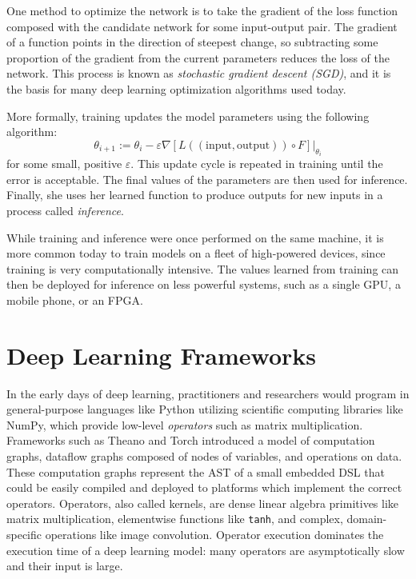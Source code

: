 One method to optimize the network is to take the gradient of the loss function composed with the
candidate network for some input-output pair. The gradient of a function points in the direction of
steepest change, so subtracting some proportion of the gradient from the current parameters reduces
the loss of the network. This process is known as \textit{stochastic gradient descent (SGD)}, and it
is the basis for many deep learning optimization algorithms used today.

More formally, training updates the model parameters using the following algorithm:
\[
  \theta_{i+1} := \theta_i - \varepsilon\nabla[L((\text{input}, \text{output})) \circ F]\Big|_{\theta_i}
\]
for some small, positive $\varepsilon$. This update cycle is repeated in training until
the error is acceptable. The final values of the parameters are then used for inference.
Finally, she uses her learned function to produce outputs for new inputs in
  a process called \textit{inference}.

While training and inference were once performed on the same machine,
  it is more common today to train models on a fleet of high-powered devices,
  since training is very computationally intensive.
The values learned from training can then be deployed for inference on less powerful systems,
  such as a single GPU, a mobile phone, or an FPGA.

\section{Deep Learning Frameworks}
\label{sec:dl_frameworks}

In the early days of deep learning, practitioners and researchers would program
  in general-purpose languages like Python utilizing
  scientific computing libraries like NumPy,
  which provide low-level \textit{operators} such as matrix multiplication.
Frameworks such as Theano and Torch introduced a model of
  computation graphs, dataflow graphs composed of nodes of
    variables, and operations on data.
These computation graphs represent the AST of a small
  embedded DSL that could be easily compiled and deployed
  to platforms which implement the correct operators.
Operators, also called kernels,
  are dense linear algebra primitives like matrix multiplication,
  elementwise functions like \verb|tanh|, and complex,
  domain-specific operations like image convolution.
Operator execution dominates the execution time of a deep learning model: many
  operators are asymptotically slow and their input is large.

